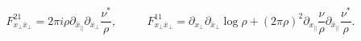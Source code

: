 \begin{equation}
F_{x_\perp\bar x_\perp}^{21}=2\pi i\rho\partial_{\bar x_{||}}\partial_{
\bar x_\perp}
\frac{\nu^*}{\rho},~~~~~~~~~~~~
F_{x_\perp\bar x_\perp}^{11}=\partial_{x_\perp}
\partial_{ \bar x_\perp}\log\rho
+(2\pi\rho)^2\partial_{x_{||}}\frac{\nu}{\rho}\partial_{\bar x_{||}}
\frac{\nu^*}{\rho}.\end{equation}


